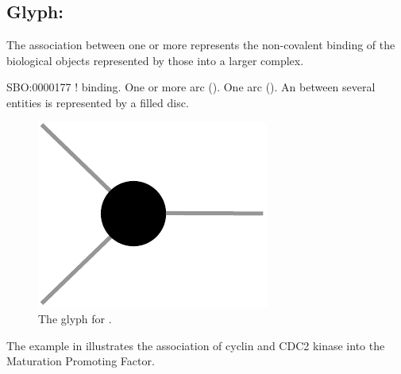 

\subsection{Glyph: }\label{sec:association}

The association between one or more  represents the non-covalent binding of the biological objects represented by those  into a larger complex.

\begin{glyphDescription}
 \glyphSboTerm SBO:0000177 ! binding.
 \glyphOrigin One or more  arc ().
 \glyphTarget  One  arc ().
 \glyphNode An  between several entities is represented by a filled disc.
 \end{glyphDescription}

\begin{figure}[H]
  \centering
  \includegraphics[scale = 0.5]{images/association}
  \caption{The \PD glyph for .}
  \label{fig:association}
\end{figure}

The example in  illustrates the association of cyclin and CDC2 kinase into the Maturation Promoting Factor.


